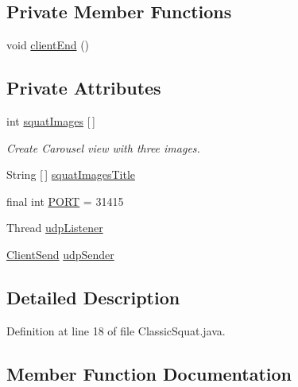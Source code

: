 \subsection*{Private Member Functions}
\begin{DoxyCompactItemize}
\item 
void \mbox{\hyperlink{classcom_1_1example_1_1trainawearapplication_1_1_classic_squat_a8f22682b2ad8898b8242090342c1ab53}{client\+End}} ()
\end{DoxyCompactItemize}
\subsection*{Private Attributes}
\begin{DoxyCompactItemize}
\item 
int \mbox{\hyperlink{classcom_1_1example_1_1trainawearapplication_1_1_classic_squat_af799c82f2b94685d95b462b3df104344}{squat\+Images}} \mbox{[}$\,$\mbox{]}
\begin{DoxyCompactList}\small\item\em Create Carousel view with three images. \end{DoxyCompactList}\item 
String \mbox{[}$\,$\mbox{]} \mbox{\hyperlink{classcom_1_1example_1_1trainawearapplication_1_1_classic_squat_a3a3fa8bda7ea911bae8e086e0e5e86dc}{squat\+Images\+Title}}
\item 
final int \mbox{\hyperlink{classcom_1_1example_1_1trainawearapplication_1_1_classic_squat_a28250169a237362b6ab0a7412cd12da6}{P\+O\+RT}} = 31415
\item 
Thread \mbox{\hyperlink{classcom_1_1example_1_1trainawearapplication_1_1_classic_squat_a5c6683281be124ed40b4ad73bcec89fc}{udp\+Listener}}
\item 
\mbox{\hyperlink{classcom_1_1example_1_1trainawearapplication_1_1_client_send}{Client\+Send}} \mbox{\hyperlink{classcom_1_1example_1_1trainawearapplication_1_1_classic_squat_af9d9055eef7e92d48f0f544bec3a7abd}{udp\+Sender}}
\end{DoxyCompactItemize}


\subsection{Detailed Description}


Definition at line 18 of file Classic\+Squat.\+java.



\subsection{Member Function Documentation}
\mbox{\label{classcom_1_1example_1_1trainawearapplication_1_1_classic_squat_a8f22682b2ad8898b8242090342c1ab53}} 
